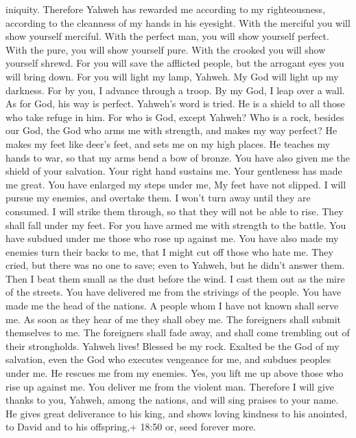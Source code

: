 iniquity.  Therefore Yahweh has rewarded me according to my
righteousness, according to the cleanness of my hands in his eyesight.
 With the merciful you will show yourself merciful. With
the perfect man, you will show yourself perfect.  With the
pure, you will show yourself pure. With the crooked you will show
yourself shrewd.  For you will save the afflicted people,
but the arrogant eyes you will bring down.  For you will
light my lamp, Yahweh. My God will light up my darkness. 
For by you, I advance through a troop. By my God, I leap over a wall.
 As for God, his way is perfect. Yahweh's word is tried. He
is a shield to all those who take refuge in him.  For who
is God, except Yahweh? Who is a rock, besides our God,  the
God who arms me with strength, and makes my way perfect? 
He makes my feet like deer's feet, and sets me on my high places.
 He teaches my hands to war, so that my arms bend a bow of
bronze.  You have also given me the shield of your
salvation. Your right hand sustains me. Your gentleness has made me
great.  You have enlarged my steps under me, My feet have
not slipped.  I will pursue my enemies, and overtake them.
I won't turn away until they are consumed.  I will strike
them through, so that they will not be able to rise. They shall fall
under my feet.  For you have armed me with strength to the
battle. You have subdued under me those who rose up against me.
 You have also made my enemies turn their backs to me, that
I might cut off those who hate me.  They cried, but there
was no one to save; even to Yahweh, but he didn't answer them.
 Then I beat them small as the dust before the wind. I cast
them out as the mire of the streets.  You have delivered me
from the strivings of the people. You have made me the head of the
nations. A people whom I have not known shall serve me.  As
soon as they hear of me they shall obey me. The foreigners shall submit
themselves to me.  The foreigners shall fade away, and
shall come trembling out of their strongholds.  Yahweh
lives! Blessed be my rock. Exalted be the God of my salvation,
 even the God who executes vengeance for me, and subdues
peoples under me.  He rescues me from my enemies. Yes, you
lift me up above those who rise up against me. You deliver me from the
violent man.  Therefore I will give thanks to you, Yahweh,
among the nations, and will sing praises to your name.  He
gives great deliverance to his king, and shows loving kindness to his
anointed, to David and to his offspring,+ 18:50 or, seed forever more.

